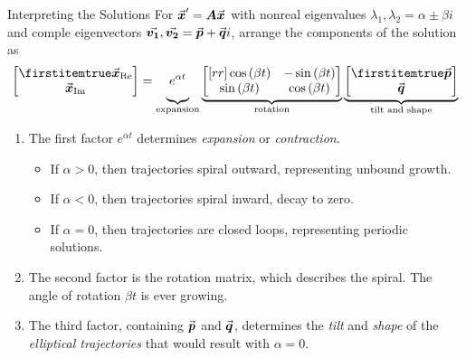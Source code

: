 \documentclass{beamer}
\newcommand{\xReal}{\vect{x}_{\text{Re}}}
\newcommand{\xImag}{\vect{x}_{\text{Im}}}
\begin{document}
\begin{frame}
\begin{block}{Interpreting the Solutions}
\onslide<+->
For ${\vec{\boldsymbol{x}}}^\prime=\boldsymbol{A}{\vec{\boldsymbol{x}}}$ with nonreal eigenvalues $\lambda_1,\lambda_2=\alpha\pm\beta i$ and comple eigenvectors ${\vec{\boldsymbol{v_1}}},{\vec{\boldsymbol{v_2}}}={\vec{\boldsymbol{p}}}+{\vec{\boldsymbol{q}}}i$, arrange the components of the solution as
\begin{equation*}
\bvector{\xReal,\xImag}=
\underbrace{%
\vphantom{%
\begin{bmatrix}[rr]
\cos[\beta t] & -\sin[\beta t] \\
\sin[\beta t] &  \cos[\beta t] \\
\end{bmatrix}}
e^{\alpha t}}_{\text{expansion}}
\underbrace{%
\begin{bmatrix}[rr]
\cos[\beta t] & -\sin[\beta t] \\
\sin[\beta t] &  \cos[\beta t] \\
\end{bmatrix}}_{\text{rotation}}
\underbrace{\bvector{\vect{p},\vect{q}}}_{\text{tilt and shape}}
\end{equation*}
\begin{enumerate}[<+- | alert@+>]
\item The first factor $e^{\alpha t}$ determines \emph{expansion} or \emph{contraction}.
\begin{itemize}[<.->]
\item If $\alpha>0$, then trajectories spiral outward, representing unbound growth.
\item If $\alpha<0$, then trajectories spiral inward, decay to zero.
\item If $\alpha=0$, then trajectories are closed loops, representing periodic solutions.
\end{itemize}
\item The second factor is the rotation matrix, which describes the spiral. The angle of rotation $\beta t$ is ever growing.
\item The third factor, containing ${\vec{\boldsymbol{p}}}$ and ${\vec{\boldsymbol{q}}}$, determines the \emph{tilt} and \emph{shape} of the \emph{elliptical trajectories} that would result with $\alpha=0$.
\end{enumerate}
\end{block}
\end{frame}
\end{document}
